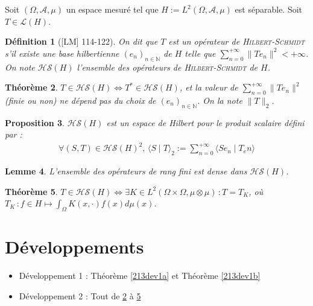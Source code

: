 \documentclass[10pt, a4paper, parskip=full, twoside, twocolumn]{report}
\newtheorem{definition}{Définition}
\newtheorem{theorem}[definition]{Théorème}
\newtheorem{proposition}[definition]{Proposition}
\newtheorem{lemma}[definition]{Lemme}
\newcommand{\IN}{\mathbb{N}}
\newcommand{\A}{\mathcal{A}}
\newcommand{\ps}[2]{\langle #1\mid #2\rangle}
\begin{document}
\textcolor{paragraphtext}{Soit $(\Omega, \A,\mu)$ un espace mesuré tel que $H := L^2(\Omega, \A, \mu)$ est séparable. Soit $T\in \mathcal{L}(H)$.}

\begin{definition}[\textnormal{[LM] 114-122}]
	On dit que $T$ est un \emph{opérateur de \textsc{Hilbert-Schmidt}} s'il existe une base hilbertienne $\left(e_n\right)_{n\in\IN}$ de $H$ telle que $\sum_{n=0}^{+\infty} \|Te_n\|^2 < +\infty$.
	On note $\mathcal{HS}(H)$ l'ensemble des opérateurs de \textsc{Hilbert-Schmidt} de $H$.
\end{definition}

\begin{tcolorbox}[
    breakable, %
    colback=developpement, %
    colframe=gray!0!black, %
    boxrule=0pt, %
    arc=1mm, %
	boxsep=0pt,
	left=0pt, right=0pt, top=0pt, bottom=0pt
]
\begin{theorem}
	\label{213dev21}
	$T \in\mathcal{HS}(H) \iff T^*\in \mathcal{HS}(H)$, et la valeur de $\sum_{n=0}^{+\infty} \|Te_n\|^2$ (finie ou non) ne dépend pas du choix de $\left(e_n\right)_{n\in\IN}$. On la note $\|T\|_2$.
\end{theorem}

\begin{proposition}
	\label{213dev22}
	$\mathcal{HS}(H)$ est un espace de Hilbert pour le produit scalaire défini par :
	\begin{align*}
		\forall (S,T)\in \mathcal{HS}(H)^2,\, \ps{S}{T}_2 := \sum_{n=0}^{+\infty} \ps{Se_n}{T_en}
	\end{align*}
\end{proposition}

\begin{lemma}
	\label{213dev23}
	L'ensemble des opérateurs de rang fini est dense dans $\mathcal{HS}(H)$.
\end{lemma}

\begin{theorem}
	\label{213dev24}
	$T\in\mathcal{HS}(H)\iff \exists K\in L^2(\Omega\times\Omega, \mu\otimes\mu)\,\colon T=T_K$, 
	où $T_K\,\colon f\in H \mapsto \int_{\Omega} K(x,\cdot)f(x)d\mu(x)$.
\end{theorem}
\end{tcolorbox}

\section*{Développements}
\begin{itemize}
	\item Développement 1 : Théorème \ref{213dev1a} et Théorème \ref{213dev1b}
	\item Développement 2 : Tout de \ref{213dev21} à \ref{213dev24}
\end{itemize}
\end{document}
